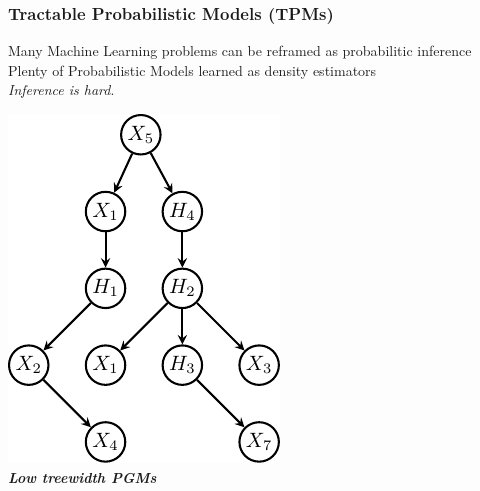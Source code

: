 \documentclass[xcolor={usenames,dvipsnames,svgnames}, compress]{beamer}
\newcommand{\cmark}{\ding{51}}%
\begin{document}
\begin{frame}[t]
  \frametitle{Tractable Probabilistic Models (TPMs)}
   \small
   Many Machine Learning problems can be reframed as probabilitic
   inference\\[6pt]
   Plenty of Probabilistic Models learned as density estimators\\[6pt]
   \emph{Inference is hard}.
   \begin{center}
    \begin{minipage}[t]{0.29\linewidth}
      \begin{center}
        \includegraphics[width=0.8\linewidth]{figures/tree}\\
        \textbf{\emph{Low treewidth PGMs}}\\[20pt]

\end{center}
\end{minipage}
\end{center}
\end{frame}
\end{document}
